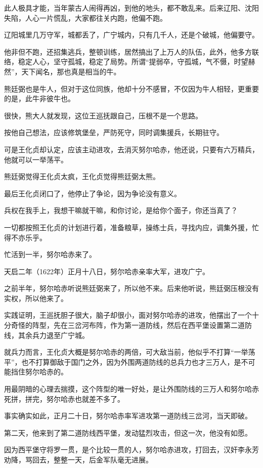 \begin{multicols}{\theparacolNo}
此人极具才能，当年蒙古人闹得再凶，到他的地头，都不敢乱来。后来辽阳、沈阳失陷，人心一片慌乱，大家都往关内跑，他偏不跑。

辽阳城里几万守军，城都丢了，广宁城内，只有几千人，还是个破城，他偏要守。

他非但不跑，还招集逃兵，整顿训练，居然搞出了上万人的队伍，此外，他多方联络，稳定人心，坚守孤城，稳定了局势。所谓“提弱卒，守孤城，气不慑，时望赫然”，天下闻名，那也真是相当的牛。

熊廷弼也是牛人，但对于这位同族，他却十分不感冒，不仅因为牛人相轻，更重要的是，此牛非彼牛也。

很快，熊大人就发现，这位王巡抚跟自己，压根不是一个思路。

按他自己想法，应该修筑堡垒，严防死守，同时调集援兵，长期驻守。

可是王化贞却认定，应该主动进攻，去消灭努尔哈赤，他还说，只要有六万精兵，他就可以一举荡平。

熊廷弼觉得王化贞太疯，王化贞觉得熊廷弼太熊。

最后王化贞闭口了，他停止了争论，因为争论没有意义。

兵权在我手上，我想干嘛就干嘛，和你讨论，是给你个面子，你还当真了？

一切都按照王化贞的计划进行着，准备粮草，操练士兵，寻找内应，调集外援，忙得不亦乐乎。

忙活到一半，努尔哈赤来了。

天启二年（1622年）正月十八日，努尔哈赤亲率大军，进攻广宁。

之前半年，努尔哈赤听说熊廷弼来了，所以他不来。后来他听说，熊廷弼压根没有实权，所以他来了。

实践证明，王巡抚胆子很大，脑子却很小，面对努尔哈赤的进攻，他摆出了一个十分奇怪的阵型，先在三岔河布阵，作为第一道防线，然后在西平堡设置第二道防线，其余兵力退至广宁城。

就兵力而言，王化贞大概是努尔哈赤的两倍，可大敌当前，他似乎不打算“一举荡平”，也不打算御敌于国门之外，因为外围两道防线的总兵力也才三万人，是不可能挡住努尔哈赤的。

用最阴暗的心理去揣摸，这个阵型的唯一好处，是让外围防线的三万人和努尔哈赤死拼，拼完，努尔哈赤也就差不多了。

事实确实如此，正月二十日，努尔哈赤率军进攻第一道防线三岔河，当天即破。

第二天，他来到了第二道防线西平堡，发动猛烈攻击，但这一次，他没有如愿。

因为西平堡守将罗一贯，是个比较一贯的人，努尔哈赤进攻，打回去，汉奸李永芳劝降，骂回去，整整一天，后金军队毫无进展。


\end{multicols}
